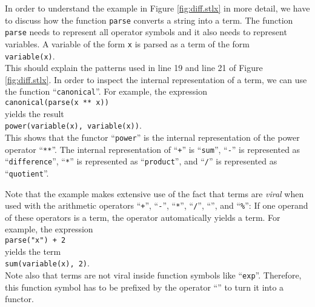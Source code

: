 In order to understand the example in Figure \ref{fig:diff.stlx} in more
detail, we have to discuss how the function \texttt{parse} converts a string into a term.  The
function \texttt{parse} needs to represent all operator symbols and it also needs to represent
variables.  A variable of the form \texttt{x} is parsed as a
term of the form
\\[0.2cm]
\hspace*{1.3cm}
\texttt{variable(x)}.
\\[0.2cm]
This should explain the patterns used in line 19 and line 21 of Figure \ref{fig:diff.stlx}.
In order to inspect the internal representation of a term, we can use the function
``\texttt{canonical}''.  For example, the expression
\\[0.2cm]
\hspace*{1.3cm}
\texttt{canonical(parse(x ** x))}
\\[0.2cm]
yields the result
\\[0.2cm]
\hspace*{1.3cm}
\texttt{power(variable(x), variable(x))}.
\\[0.2cm]
This shows that the functor ``\texttt{power}'' is the internal representation of the
power operator ``\texttt{**}''.  The internal representation of 
``\texttt{+}'' is ``\texttt{sum}'',
``\texttt{-}'' is represented as ``\texttt{difference}'',
``\texttt{*}'' is represented as ``\texttt{product}'', and
``\texttt{/}'' is represented as ``\texttt{quotient}''.

Note that the example makes extensive use of the fact that terms are \emph{viral} when used with
the arithmetic operators 
``\texttt{+}'', ``\texttt{-}'', ``\texttt{*}'', ``\texttt{/}'', ``\texttt{}'', and
``\texttt{\%}'':  
If one operand of these operators is a term, the operator automatically yields a term.
For example, the expression 
\\[0.2cm]
\hspace*{1.3cm}
\texttt{parse("x") + 2}
\\[0.2cm]
yields the term
\\[0.2cm]
\hspace*{1.3cm}
\texttt{sum(variable(x), 2)}.
\\[0.2cm]
Note also that terms are not viral inside function symbols like ``\texttt{exp}''.  Therefore, this
function symbol has to be prefixed by the operator ``\texttt{}'' to turn it
into a functor.

